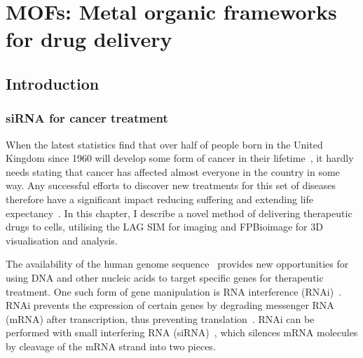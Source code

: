 \chapter{MOFs: Metal organic frameworks for drug delivery} \label{chap:MOF}


\ifpdf
    \graphicspath{{Chapter4/Figs/Raster/}{Chapter4/Figs/PDF/}{Chapter4/Figs/}}
\else
    \graphicspath{{Chapter4/Figs/Vector/}{Chapter4/Figs/}}
\fi

%

\section{Introduction} \label{sec:MOF-intro}
\subsection{siRNA for cancer treatment}
When the latest statistics find that over half of people born in the United Kingdom since 1960 will develop some form of cancer in their lifetime~\cite{ahmad2015trends}, it hardly needs stating that cancer has affected almost everyone in the country in some way. 
Any successful efforts to discover new treatments for this set of diseases therefore have a significant impact reducing suffering and extending life expectancy~\cite{hesketh2012betrayed}. 
In this chapter, I describe a novel method of delivering therapeutic drugs to cells, utilising the LAG SIM for imaging and FPBioimage for 3D visualisation and analysis. 

The availability of the human genome sequence~\cite{venter2001sequence, bentley2008accurate} provides new opportunities for using DNA and other nucleic acids to target specific genes for therapeutic treatment. 
One such form of gene manipulation is RNA interference (RNAi)~\cite{fire1998potent, timmons1998specific}. 
RNAi prevents the expression of certain genes by degrading messenger RNA (mRNA) after transcription, thus preventing translation~\cite{hannon2002rna}. 
RNAi can be performed with small interfering RNA (siRNA)~\cite{hamilton1999species, elbashir2001duplexes}, which silences mRNA molecules by cleavage of the mRNA strand into two pieces. 

